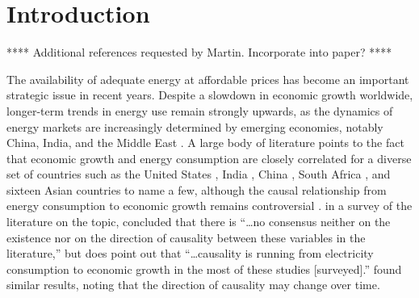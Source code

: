 \documentclass[preprint,authoryear,12pt]{elsarticle}\usepackage[]{graphicx}\usepackage[]{color}
\begin{document}

\section{Introduction} 
\label{sec:Introduction}

**** Additional references requested by Martin. Incorporate into paper? ****

\citet{Lindenberger:2011dx}

\citet{Stresing:2008cq}

The availability of adequate energy at affordable prices 
has become an important strategic issue in recent years.
Despite a slowdown in economic growth worldwide, 
longer-term trends in energy use remain strongly upwards, 
as the dynamics of energy markets are increasingly determined by emerging economies, 
notably China, India, and the Middle East \citep{IEA:2012ty}. 
A large body of literature points to the fact that 
economic growth and energy consumption are closely correlated 
for a diverse set of countries such as 
the United States \citep{Stern:2000wq, Cleveland:1984p5055}, 
India \citep{Paul:2004jl}, 
China \citep{Wang:2011fe}, 
South Africa \citep{Menyah:2010hl, Odhiambo:2009hj}, and 
sixteen Asian countries \citep{Lee:2008dm}
to name a few, 
although the causal relationship from energy consumption 
to economic growth remains controversial \citep{Chen:2012fs, Ozturk:2010kb, Stern:2013aa}. 
\citet[p. 347]{Ozturk:2010kb} in a survey of the literature on the topic, 
concluded that there is 
``\dots no consensus neither on the existence nor on the direction of 
causality between these variables in the literature,'' 
but does point out that ``\dots causality is running from 
electricity consumption to economic growth 
in the most of these studies [surveyed].''
\citet{Stern:2013aa} found similar results,
noting that the direction of causality may change over time.
\end{document}
